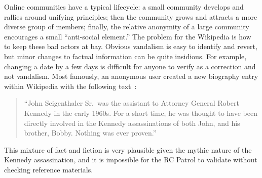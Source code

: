 Online communities have a typical lifecycle:
a small community develops and rallies around unifying principles;
then the community grows and attracts a more diverse group of members;
finally, the relative anonymity of a large community encourages
a small ``anti-social element.''
The problem for the Wikipedia is how to keep these bad actors at bay.
Obvious vandalism is easy to identify and revert,
but minor changes to factual information can be quite insidious.
For example, changing a date by a few days is difficult for anyone
to verify as a correction and not vandalism.
Most famously, an anonymous user created a new biography entry
within Wikipedia with the following
text~\cite{Seigenthaler05,NewYorkTimes05a,NewYorkTimes05b}:
\begin{quote}
``John Seigenthaler Sr.\ was the assistant to
Attorney General Robert Kennedy in the early 1960s.
For a short time, he was thought to have been directly involved
in the Kennedy assassinations of both John, and his brother, Bobby.
Nothing was ever proven.''
\end{quote}
This mixture of fact and fiction is very plausible given the
mythic nature of the Kennedy assassination, and it is impossible
for the RC Patrol to validate without checking reference materials.

